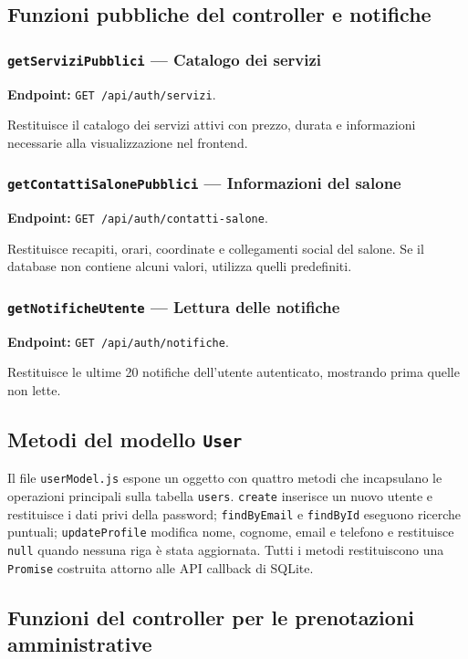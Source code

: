 \documentclass[12pt,a4paper]{article}
\begin{document}
\subsection{Funzioni pubbliche del controller e notifiche}

\subsubsection{\texttt{getServiziPubblici} --- Catalogo dei servizi}
\textbf{Endpoint:} \texttt{GET /api/auth/servizi}.

Restituisce il catalogo dei servizi attivi con prezzo, durata e informazioni
necessarie alla visualizzazione nel frontend.

\subsubsection{\texttt{getContattiSalonePubblici} --- Informazioni del salone}
\textbf{Endpoint:} \texttt{GET /api/auth/contatti-salone}.

Restituisce recapiti, orari, coordinate e collegamenti social del salone. Se
il database non contiene alcuni valori, utilizza quelli predefiniti.

\subsubsection{\texttt{getNotificheUtente} --- Lettura delle notifiche}
\textbf{Endpoint:} \texttt{GET /api/auth/notifiche}.

Restituisce le ultime 20 notifiche dell'utente autenticato, mostrando prima
quelle non lette.

\subsection{Metodi del modello \texttt{User}}
Il file \texttt{userModel.js} espone un oggetto con quattro metodi che
incapsulano le operazioni principali sulla tabella \texttt{users}.
\texttt{create} inserisce un nuovo utente e restituisce i dati privi della
password; \texttt{findByEmail} e \texttt{findById} eseguono ricerche puntuali;
\texttt{updateProfile} modifica nome, cognome, email e telefono e restituisce
\texttt{null} quando nessuna riga è stata aggiornata. Tutti i metodi
restituiscono una \texttt{Promise} costruita attorno alle API callback di
SQLite.

\newpage

\subsection{Funzioni del controller per le prenotazioni amministrative}
\end{document}
